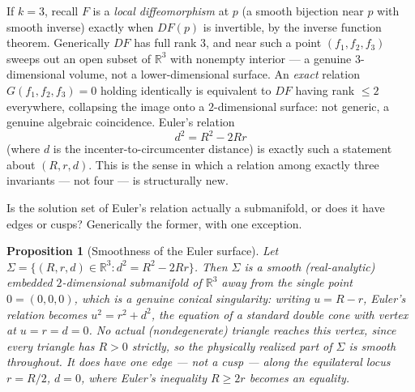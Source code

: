 \documentclass[11pt,reqno]{amsart}
\numberwithin{equation}{section}
\newtheorem{proposition}[theorem]{Proposition}
\theoremstyle{definition}
\theoremstyle{remark}
\begin{document}
If $k=3$, recall $F$ is a \emph{local diffeomorphism} at $p$ (a smooth
bijection near $p$ with smooth inverse) exactly when $DF(p)$ is invertible,
by the inverse function theorem. Generically $DF$ has full rank $3$, and
near such a point $(f_1,f_2,f_3)$ sweeps out an open subset of $\mathbb
R^3$ with nonempty interior --- a genuine $3$-dimensional volume, not a
lower-dimensional surface. An \emph{exact} relation $G(f_1,f_2,f_3)=0$
holding identically is equivalent to $DF$ having rank $\le2$ everywhere,
collapsing the image onto a $2$-dimensional surface: not generic, a genuine
algebraic coincidence. Euler's relation
\begin{equation}
  d^2=R^2-2Rr
\end{equation}
(where $d$ is the incenter-to-circumcenter distance) is exactly such a
statement about $(R,r,d)$. This is the sense in which a relation among
exactly three invariants --- not four --- is structurally new.

Is the solution set of Euler's relation actually a submanifold, or does it
have edges or cusps? Generically the former, with one exception.

\begin{proposition}[Smoothness of the Euler surface]\label{prop:eulersmooth}
Let $\Sigma=\{(R,r,d)\in\mathbb R^3 : d^2=R^2-2Rr\}$. Then $\Sigma$ is a
smooth (real-analytic) embedded $2$-dimensional submanifold of $\mathbb R^3$
away from the single point $0=(0,0,0)$, which is a genuine conical
singularity: writing $u=R-r$, Euler's relation becomes $u^2=r^2+d^2$, the
equation of a standard double cone with vertex at $u=r=d=0$. No actual
(nondegenerate) triangle reaches this vertex, since every triangle has
$R>0$ strictly, so the physically realized part of $\Sigma$ is smooth
throughout. It does have one edge --- not a cusp --- along the equilateral
locus $r=R/2$, $d=0$, where Euler's inequality $R\ge2r$ becomes an equality.
\end{proposition}
\end{document}
